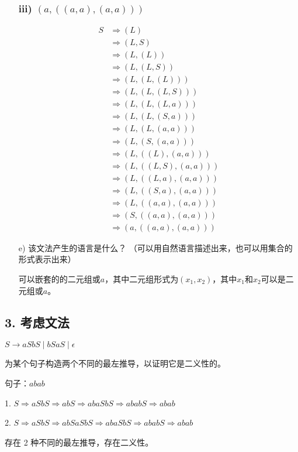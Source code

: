 \documentclass[a4paper, body={18cm,22cm}]{article}
\begin{document}
\begin{enumerate}
\subsubsection*{iii) $(a, ((a, a), (a, a)))$}
\begin{align*}
S &\Rightarrow (L) \\
&\Rightarrow (L,S) \\
&\Rightarrow (L,(L)) \\
&\Rightarrow (L,(L,S)) \\
&\Rightarrow (L,(L,(L))) \\
&\Rightarrow (L,(L,(L,S))) \\
&\Rightarrow (L,(L,(L,a))) \\
&\Rightarrow (L,(L,(S,a))) \\
&\Rightarrow (L,(L,(a,a))) \\
&\Rightarrow (L,(S,(a,a))) \\
&\Rightarrow (L,((L),(a,a))) \\
&\Rightarrow (L,((L,S),(a,a))) \\
&\Rightarrow (L,((L,a),(a,a))) \\
&\Rightarrow (L,((S,a),(a,a))) \\
&\Rightarrow (L,((a,a),(a,a))) \\
&\Rightarrow (S,((a,a),(a,a))) \\
&\Rightarrow (a,((a,a),(a,a)))
\end{align*}
    \item[e)] 该文法产生的语言是什么？ （可以用自然语言描述出来，也可以用集合的
    形式表示出来）

    可以嵌套的的二元组或$a$，其中二元组形式为$(x_1,x_2)$，其中$x_1$和$x_2$可以是二元组或$a$。
\end{enumerate}

\subsection*{3. 考虑文法 }

$S \to aSbS \mid bSaS \mid \epsilon$
 
为某个句子构造两个不同的最左推导，以证明它是二义性的。
 
句子：\( abab \)

1. \( S \Rightarrow aSbS \Rightarrow abS \Rightarrow abaSbS \Rightarrow ababS \Rightarrow abab \)

2. \( S \Rightarrow aSbS \Rightarrow abSaSbS \Rightarrow abaSbS \Rightarrow ababS \Rightarrow abab \)

存在 2 种不同的最左推导，存在二义性。
\end{document}
